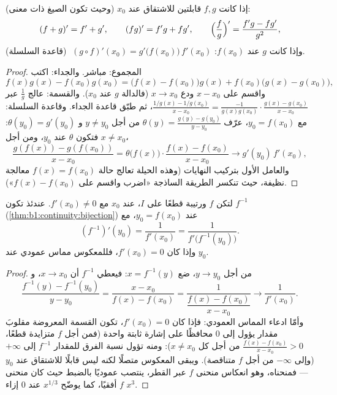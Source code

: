 \begin{theorem}[العمليات]\label{thm:b1:derivative:operations}
إذا كانت $f, g$ قابلتين للاشتقاق عند $x_0$ (وحيث تكون الصيغ ذات
معنى):
\[
(f + g)' = f' + g', \qquad
(fg)' = f'g + fg', \qquad
\Bigl(\frac fg\Bigr)' = \frac{f'g - fg'}{g^2},
\]
وإذا كانت $g$  عند $f(x_0)$:
$\;(g \circ f)'(x_0) = g'\bigl(f(x_0)\bigr)\, f'(x_0)$ (قاعدة
السلسلة).
\end{theorem}

\begin{proof}
المجموع: مباشر. والجداء: اكتب
\[
f(x)g(x) - f(x_0)g(x_0)
= \bigl(f(x) - f(x_0)\bigr) g(x) + f(x_0)\bigl(g(x) - g(x_0)\bigr),
\]
واقسم على $x - x_0$ ودع $x \to x_0$ (فالدالة $g$  عند $x_0$).
والقسمة: عالج $\frac 1g$ عبر $\frac{1/g(x) - 1/g(x_0)}{x - x_0} =
\frac{-1}{g(x)g(x_0)}\cdot\frac{g(x) - g(x_0)}{x - x_0}$، ثم طبّق
قاعدة الجداء. وقاعدة السلسلة: مع $y_0 = f(x_0)$، عرّف
$\theta(y) = \frac{g(y) - g(y_0)}{y - y_0}$ من أجل $y \neq y_0$ و
$\theta(y_0) = g'(y_0)$: فتكون $\theta$  عند $y_0$، ومن أجل
$x \neq x_0$،
\[
\frac{g(f(x)) - g(f(x_0))}{x - x_0}
= \theta\bigl(f(x)\bigr)\cdot \frac{f(x) - f(x_0)}{x - x_0}
\longrightarrow g'(y_0)\, f'(x_0),
\]
والعامل الأول بتركيب النهايات (وهذه الحيلة تعالج
حالة $f(x) = f(x_0)$ معالجة نظيفة، حيث تنكسر الطريقة الساذجة
«اضرب واقسم على $f(x) - f(x_0)$»).
\end{proof}

\begin{theorem}\label{thm:b1:derivative:inverse}
لتكن $f$  ورتيبة قطعًا على $I$، 
عند $x_0$ مع $f'(x_0) \neq 0$. عندئذ تكون $f^{-1}$
(\cref{thm:b1:continuity:bijection})  عند $y_0 =
f(x_0)$، مع
\[
(f^{-1})'(y_0) = \frac{1}{f'(x_0)} = \frac{1}{f'\bigl(f^{-1}(y_0)\bigr)} .
\]
وإذا كان $f'(x_0) = 0$، فللمعكوس مماس عمودي عند $y_0$.
\end{theorem}

\begin{proof}
من أجل $y \to y_0$، ضع $x = f^{-1}(y)$: فيعطي  $f^{-1}$ أن $x
\to x_0$، و
\[
\frac{f^{-1}(y) - f^{-1}(y_0)}{y - y_0}
= \frac{x - x_0}{f(x) - f(x_0)}
= \frac{1}{\dfrac{f(x) - f(x_0)}{x - x_0}}
\longrightarrow \frac{1}{f'(x_0)} .
\]
وأمّا ادعاء المماس العمودي: فإذا كان $f'(x_0) = 0$، تكون القسمة المعروضة
مقلوبَ مقدار يؤول إلى $0$ محافظًا على
إشارة ثابتة واحدة (فمن أجل $f$ متزايدة قطعًا، $\frac{f(x) -
f(x_0)}{x - x_0} > 0$ من أجل كل $x \neq x_0$): ومنه تؤول نسبة
الفرق للمقدار $f^{-1}$ إلى $+\infty$ (وإلى $-\infty$
من أجل $f$ متناقصة). ويبقى المعكوس متصلًا لكنه ليس
قابلًا للاشتقاق عند $y_0$ --- فمنحناه، وهو انعكاس منحنى $f$
عبر القطر، ينتصب عموديًا بالضبط حيث كان منحنى $f$
أفقيًا، كما يوضّح $x^{1/3}$ عند $0$ إزاء $x^3$.
\end{proof}

